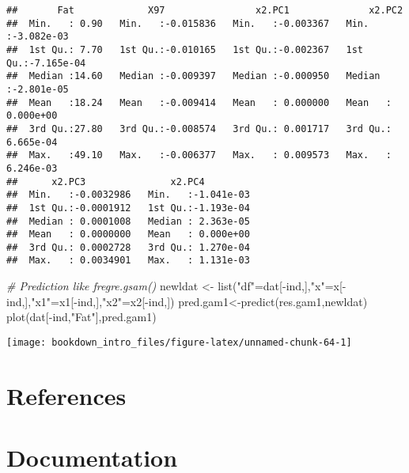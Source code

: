 \documentclass[
]{book}
\newenvironment{Shaded}{\begin{snugshade}}{\end{snugshade}}
\newcommand{\CommentTok}[1]{\textcolor[rgb]{0.56,0.35,0.01}{\textit{#1}}}
\newcommand{\FunctionTok}[1]{\textcolor[rgb]{0.00,0.00,0.00}{#1}}
\newcommand{\NormalTok}[1]{#1}
\newcommand{\OtherTok}[1]{\textcolor[rgb]{0.56,0.35,0.01}{#1}}
\newcommand{\SpecialCharTok}[1]{\textcolor[rgb]{0.00,0.00,0.00}{#1}}
\newcommand{\StringTok}[1]{\textcolor[rgb]{0.31,0.60,0.02}{#1}}
\begin{document}
\begin{verbatim}
##       Fat             X97                x2.PC1              x2.PC2          
##  Min.   : 0.90   Min.   :-0.015836   Min.   :-0.003367   Min.   :-3.082e-03  
##  1st Qu.: 7.70   1st Qu.:-0.010165   1st Qu.:-0.002367   1st Qu.:-7.165e-04  
##  Median :14.60   Median :-0.009397   Median :-0.000950   Median :-2.801e-05  
##  Mean   :18.24   Mean   :-0.009414   Mean   : 0.000000   Mean   : 0.000e+00  
##  3rd Qu.:27.80   3rd Qu.:-0.008574   3rd Qu.: 0.001717   3rd Qu.: 6.665e-04  
##  Max.   :49.10   Max.   :-0.006377   Max.   : 0.009573   Max.   : 6.246e-03  
##      x2.PC3               x2.PC4          
##  Min.   :-0.0032986   Min.   :-1.041e-03  
##  1st Qu.:-0.0001912   1st Qu.:-1.193e-04  
##  Median : 0.0001008   Median : 2.363e-05  
##  Mean   : 0.0000000   Mean   : 0.000e+00  
##  3rd Qu.: 0.0002728   3rd Qu.: 1.270e-04  
##  Max.   : 0.0034901   Max.   : 1.131e-03
\end{verbatim}

\begin{Shaded}
\begin{Highlighting}[]
\CommentTok{\# Prediction like fregre.gsam() }
\NormalTok{newldat }\OtherTok{\textless{}{-}} \FunctionTok{list}\NormalTok{(}\StringTok{"df"}\OtherTok{=}\NormalTok{dat[}\SpecialCharTok{{-}}\NormalTok{ind,],}\StringTok{"x"}\OtherTok{=}\NormalTok{x[}\SpecialCharTok{{-}}\NormalTok{ind,],}\StringTok{"x1"}\OtherTok{=}\NormalTok{x1[}\SpecialCharTok{{-}}\NormalTok{ind,],}\StringTok{"x2"}\OtherTok{=}\NormalTok{x2[}\SpecialCharTok{{-}}\NormalTok{ind,])}
\NormalTok{pred.gam1}\OtherTok{\textless{}{-}}\FunctionTok{predict}\NormalTok{(res.gam1,newldat)}
\FunctionTok{plot}\NormalTok{(dat[}\SpecialCharTok{{-}}\NormalTok{ind,}\StringTok{"Fat"}\NormalTok{],pred.gam1)}
\end{Highlighting}
\end{Shaded}

\begin{center}\texttt{[image: bookdown\_intro\_files/figure-latex/unnamed-chunk-64-1]} \end{center}

\hypertarget{references-2}{%
\chapter*{References}\label{references-2}}

\hypertarget{documentation}{%
\chapter*{Documentation}\label{documentation}}
\end{document}
